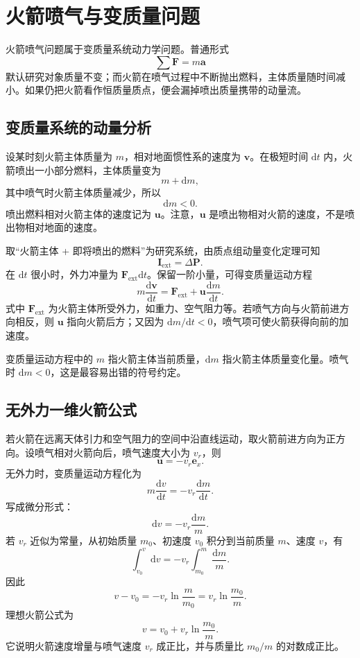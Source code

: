 \section{火箭喷气与变质量问题}

火箭喷气问题属于变质量系统动力学问题。普通形式
\[
    \sum \boldsymbol F=m\boldsymbol a
\]
默认研究对象质量不变；而火箭在喷气过程中不断抛出燃料，主体质量随时间减小。如果仍把火箭看作恒质量质点，便会漏掉喷出质量携带的动量流。

\subsection{变质量系统的动量分析}

设某时刻火箭主体质量为 $m$，相对地面惯性系的速度为 $\boldsymbol v$。在极短时间 $\mathrm dt$ 内，火箭喷出一小部分燃料，主体质量变为
\[
    m+\mathrm dm ,
\]
其中喷气时火箭主体质量减少，所以
\[
    \mathrm dm<0.
\]
喷出燃料相对火箭主体的速度记为 $\boldsymbol u$。注意，$\boldsymbol u$ 是喷出物相对火箭的速度，不是喷出物相对地面的速度。

取“火箭主体 + 即将喷出的燃料”为研究系统，由质点组动量变化定理可知
\[
    \boldsymbol I_{\mathrm{ext}}=\Delta \boldsymbol P .
\]
在 $\mathrm dt$ 很小时，外力冲量为 $\boldsymbol F_{\mathrm{ext}}\mathrm dt$。保留一阶小量，可得变质量运动方程
\[
    \boxed{
    m\frac{\mathrm d\boldsymbol v}{\mathrm dt}
    =
    \boldsymbol F_{\mathrm{ext}}
    +
    \boldsymbol u\frac{\mathrm dm}{\mathrm dt}
    } .
\]
式中 $\boldsymbol F_{\mathrm{ext}}$ 为火箭主体所受外力，如重力、空气阻力等。若喷气方向与火箭前进方向相反，则 $\boldsymbol u$ 指向火箭后方；又因为 $\mathrm dm/\mathrm dt<0$，喷气项可使火箭获得向前的加速度。

\begin{note}
变质量运动方程中的 $m$ 指火箭主体当前质量，$\mathrm dm$ 指火箭主体质量变化量。喷气时 $\mathrm dm<0$，这是最容易出错的符号约定。
\end{note}

\subsection{无外力一维火箭公式}

若火箭在远离天体引力和空气阻力的空间中沿直线运动，取火箭前进方向为正方向。设喷气相对火箭向后，喷气速度大小为 $v_r$，则
\[
    \boldsymbol u=-v_r\boldsymbol e_x .
\]
无外力时，变质量运动方程化为
\[
    m\frac{\mathrm dv}{\mathrm dt}
    =
    -v_r\frac{\mathrm dm}{\mathrm dt}.
\]
写成微分形式：
\[
    \mathrm dv=-v_r\frac{\mathrm dm}{m}.
\]
若 $v_r$ 近似为常量，从初始质量 $m_0$、初速度 $v_0$ 积分到当前质量 $m$、速度 $v$，有
\[
    \int_{v_0}^{v}\mathrm dv
    =
    -v_r\int_{m_0}^{m}\frac{\mathrm dm}{m}.
\]
因此
\[
    v-v_0
    =
    -v_r\ln\frac{m}{m_0}
    =
    v_r\ln\frac{m_0}{m}.
\]
理想火箭公式为
\[
    \boxed{
    v=v_0+v_r\ln\frac{m_0}{m}
    } .
\]
它说明火箭速度增量与喷气速度 $v_r$ 成正比，并与质量比 $m_0/m$ 的对数成正比。

